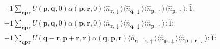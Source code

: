 \begin{align*}
	&-1 \sum_{ \mathbf{q} \mathbf{p} \mathbf{r} } U( \mathbf{p}, \mathbf{q}, 0 )  \alpha( \mathbf{p}, \mathbf{r}, 0 )   \langle \hat{n}_{ \mathbf{r}, \downarrow } \rangle \langle \hat{n}_{ \mathbf{q}, \downarrow } \rangle \langle \hat{n}_{ \mathbf{p}, \uparrow } \rangle \langle \hat{n}_{ \mathbf{p}, \uparrow } \rangle : \hat{1} : \\
	&+1 \sum_{ \mathbf{q} \mathbf{p} \mathbf{r} } U( \mathbf{p}, \mathbf{q}, 0 )  \alpha( \mathbf{p}, \mathbf{r}, 0 )   \langle \hat{n}_{ \mathbf{r}, \downarrow } \rangle \langle \hat{n}_{ \mathbf{q}, \downarrow } \rangle \langle \hat{n}_{ \mathbf{p}, \uparrow } \rangle : \hat{1} : \\
	&-1 \sum_{ \mathbf{q} \mathbf{p} \mathbf{r} } U( \mathbf{q}-\mathbf{r}, \mathbf{p}+\mathbf{r}, \mathbf{r} )  \alpha( \mathbf{q}, \mathbf{p}, \mathbf{r} )   \langle \hat{n}_{ \mathbf{q}-\mathbf{r}, \uparrow } \rangle \langle \hat{n}_{ \mathbf{p}, \downarrow } \rangle \langle \hat{n}_{ \mathbf{p}+\mathbf{r}, \downarrow } \rangle : \hat{1} :
\end{align*}
